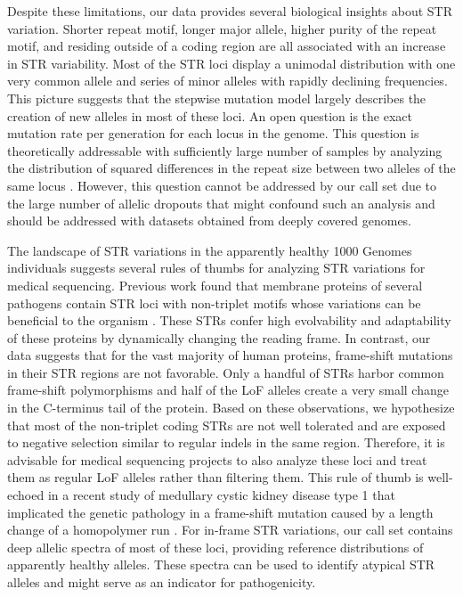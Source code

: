Despite these limitations, our data provides several biological insights about STR variation. Shorter repeat motif, longer major allele, higher purity of the repeat motif, and residing outside of a coding region are all associated with an increase in STR variability. Most of the STR loci display a unimodal distribution with one very common allele and series of minor alleles with rapidly declining frequencies. This picture suggests that the stepwise mutation model largely describes the creation of new alleles in most of these loci. An open question is the exact mutation rate per generation for each locus in the genome. This question is theoretically addressable with sufficiently large number of samples by analyzing the distribution of squared differences in the repeat size between two alleles of the same locus \cite{SunHelgasonMassonEtAl2012}. However, this question cannot be addressed by our call set due to the large number of allelic dropouts that might confound such an analysis and should be addressed with datasets obtained from deeply covered genomes. 

The landscape of STR variations in the apparently healthy 1000 Genomes individuals suggests several rules of thumbs for analyzing STR variations for medical sequencing. Previous work found that membrane proteins of several pathogens contain STR loci with non-triplet motifs whose variations can be beneficial to the organism \cite{GemayelVincesLegendreEtAl2010}. These STRs confer high evolvability and adaptability of these proteins by dynamically changing the reading frame. In contrast, our data suggests that for the vast majority of human proteins, frame-shift mutations in their STR regions are not favorable. Only a handful of STRs harbor common frame-shift polymorphisms and half of the LoF alleles create a very small change in the C-terminus tail of the protein. Based on these observations, we hypothesize that most of the non-triplet coding STRs are not well tolerated and are exposed to negative selection similar to regular indels in the same region. Therefore, it is advisable for medical sequencing projects to also analyze these loci and treat them as regular LoF alleles rather than filtering them. This rule of thumb is well-echoed in a recent study of medullary cystic kidney disease type 1 that implicated the genetic pathology in a frame-shift mutation caused by a length change of a homopolymer run \cite{KirbyGnirkeJaffeEtAl2013}. For in-frame STR variations, our call set contains deep allelic spectra of most of these loci, providing reference distributions of apparently healthy alleles. These spectra can be used to identify atypical STR alleles and might serve as an indicator for pathogenicity.  

